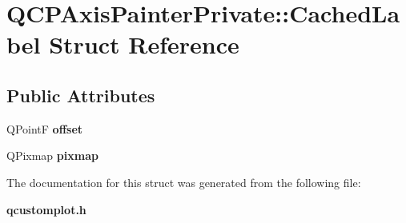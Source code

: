 \section{Q\+C\+P\+Axis\+Painter\+Private\+:\+:Cached\+Label Struct Reference}
\label{struct_q_c_p_axis_painter_private_1_1_cached_label}
\subsection*{Public Attributes}
\begin{DoxyCompactItemize}
\item 
Q\+Point\+F {\bfseries offset}\label{struct_q_c_p_axis_painter_private_1_1_cached_label_a5f502db71c92e572f1e6f44f62c59d8e}

\item 
Q\+Pixmap {\bfseries pixmap}\label{struct_q_c_p_axis_painter_private_1_1_cached_label_a461597cbd470914a9d24b64d16037a88}

\end{DoxyCompactItemize}


The documentation for this struct was generated from the following file\+:\begin{DoxyCompactItemize}
\item 
{\bf qcustomplot.\+h}\end{DoxyCompactItemize}
